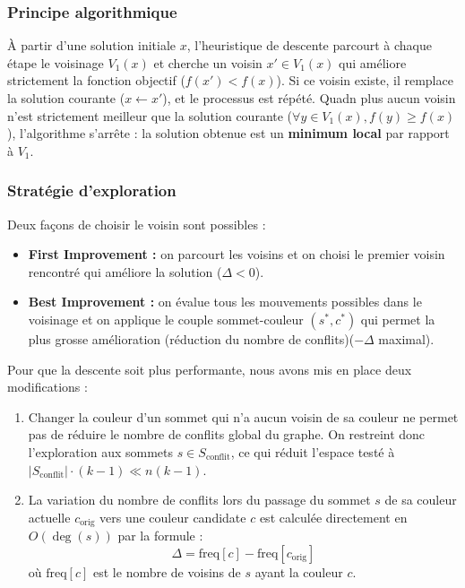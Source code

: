 \documentclass{article}
\begin{document}
\subsubsection{Principe algorithmique}
À partir d'une solution initiale $x$, l'heuristique de descente parcourt à chaque étape le voisinage $V_1(x)$ et cherche un voisin $x' \in V_1(x)$ qui améliore strictement la fonction objectif ($f(x') < f(x)$). Si ce voisin existe, il remplace la solution courante ($x \leftarrow x'$), et le processus est répété.
Quadn plus aucun voisin n'est strictement meilleur que la solution courante ($\forall y \in V_1(x), f(y) \ge f(x)$), l'algorithme s'arrête : la solution obtenue est un \textbf{minimum local} par rapport à $V_1$.

\subsubsection{Stratégie d'exploration}
Deux façons de choisir le voisin sont possibles :
\begin{itemize}
    \item \textbf{First Improvement :} on parcourt les voisins et on choisi le premier voisin rencontré qui améliore la solution ($\Delta < 0$).
    \item \textbf{Best Improvement :} on évalue tous les mouvements possibles dans le voisinage et on applique le couple sommet-couleur $(s^*, c^*)$ qui permet la plus grosse amélioration (réduction du nombre de conflits)($-\Delta$ maximal).
\end{itemize}

Pour que la descente soit plus performante, nous avons mis en place deux modifications :
\begin{enumerate}
    \item Changer la couleur d'un sommet qui n'a aucun voisin de sa couleur ne permet pas de réduire le nombre de conflits global du graphe. On restreint donc l'exploration aux sommets $s \in S_{\text{conflit}}$, ce qui réduit l'espace testé à $|S_{\text{conflit}}| \cdot (k-1) \ll n(k-1)$.
    \item La variation du nombre de conflits lors du passage du sommet $s$ de sa couleur actuelle $c_{\text{orig}}$ vers une couleur candidate $c$ est calculée directement en $O(\deg(s))$ par la formule :
    \[
    \Delta = \text{freq}[c] - \text{freq}[c_{\text{orig}}]
    \]
    où $\text{freq}[c]$ est le nombre de voisins de $s$ ayant la couleur $c$.
\end{enumerate}
\end{document}
